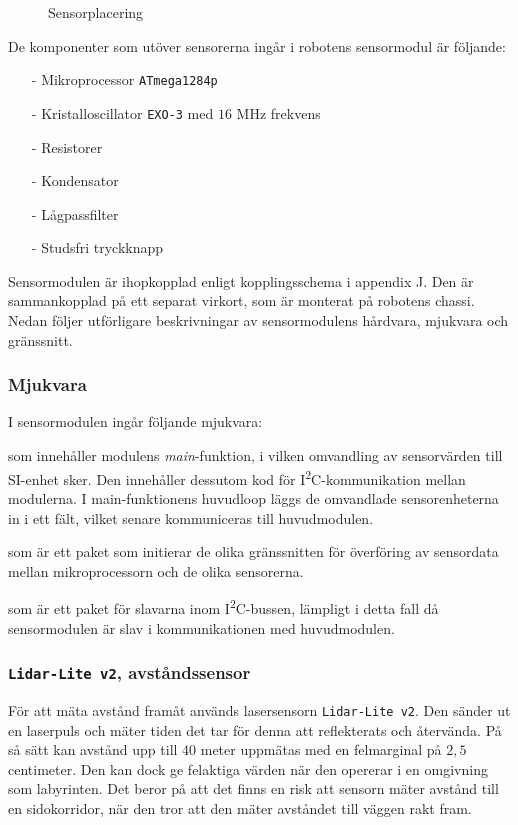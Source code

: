 \documentclass[11pt]{article}
\begin{document}
\begin{flushleft}
\begin{figure}[htbp]
\centering
\noindent\resizebox{.8\textwidth}{!}{
		}
	\caption{Sensorplacering \label{sensors}}
\end{figure}

De komponenter som utöver sensorerna ingår i robotens sensormodul är följande:
\begin{itemize}
  \item[-] Mikroprocessor \verb+ATmega1284p+
  \item[-] Kristalloscillator \verb+EXO-3+ med $16$ MHz frekvens
  \item[-] Resistorer
  \item[-] Kondensator
  \item[-] Lågpassfilter
  \item[-] Studsfri tryckknapp
\end{itemize}

Sensormodulen är ihopkopplad enligt kopplingsschema i appendix J. Den är sammankopplad på ett separat virkort, som är monterat på robotens chassi. Nedan följer utförligare beskrivningar av sensormodulens hårdvara, mjukvara och gränssnitt.

\subsubsection{Mjukvara}
I sensormodulen ingår följande mjukvara: 

\begin{description}[style=unboxed, leftmargin=0cm]
  \item[sensorModule.c] som innehåller modulens \textit{main}-funktion, i vilken omvandling av sensorvärden till SI-enhet sker. Den innehåller dessutom kod för I\textsuperscript{2}C-kommunikation mellan modulerna. I main-funktionens huvudloop läggs de omvandlade sensorenheterna in i ett fält, vilket senare kommuniceras till huvudmodulen.
  \item[sensorInit.h] som är ett paket som initierar de olika gränssnitten för överföring av sensordata mellan mikroprocessorn och de olika sensorerna.
  \item[I2C\_slave.h] som är ett paket för slavarna inom I\textsuperscript{2}C-bussen, lämpligt i detta fall då sensormodulen är slav i kommunikationen med huvudmodulen.
\end{description}

\subsubsection{\texttt{Lidar-Lite v2}, avståndssensor}
För att mäta avstånd framåt används lasersensorn \verb+Lidar-Lite v2+. Den sänder ut en laserpuls och mäter tiden det tar för denna att reflekterats och återvända. På så sätt kan avstånd upp till $40$ meter uppmätas med en felmarginal på $2,5$ centimeter. Den kan dock ge felaktiga värden när den opererar i en omgivning som labyrinten. Det beror på att det finns en risk att sensorn mäter avstånd till en sidokorridor, när den tror att den mäter avståndet till väggen rakt fram.


\end{flushleft}
\end{document}
